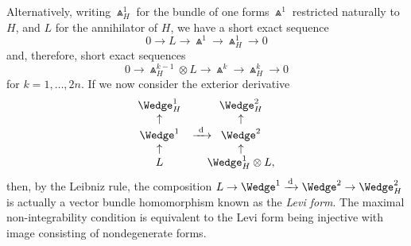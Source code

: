\documentclass[pdftex]{sigma}%
\numberwithin{equation}{section}
\begin{document}
Alternatively, writing $\Wedge_H^1$ for the bundle of one
forms $\Wedge^1$ restricted naturally to $H$, and $L$ for the annihilator of
$H$, we have a short exact sequence
\begin{equation*}%
0\to L\to\Wedge^1\to\Wedge_H^1\to 0
\end{equation*}
and, therefore, short exact sequences
\begin{equation}\label{SES2}
0\to \Wedge_H^{k-1}\otimes L\to\Wedge^k\to\Wedge_H^k\to 0\end{equation}
for $k=1,\ldots,2n$.
If we now consider the exterior derivative
\[\begin{array}{ccc}\Wedge_H^1&&\Wedge_H^2\\ \uparrow&&\uparrow\\
\Wedge^1&\xrightarrow{\ {\rm d}\ }\hspace{-14pt}
&\Wedge^2\\ \uparrow&&\uparrow\\
L&&\Wedge_H^1\otimes L,
\end{array}\]
then, by the Leibniz rule, the composition
$L\to\Wedge^1\xrightarrow{\,{\rm d}\,}\Wedge^2\to\Wedge_H^2$ is actually a vector
bundle homomorphism
known as the {\em Levi form}. The maximal non-integrability condition is
equivalent to the Levi form being injective with image consisting of
nondegenerate forms.
\end{document}
